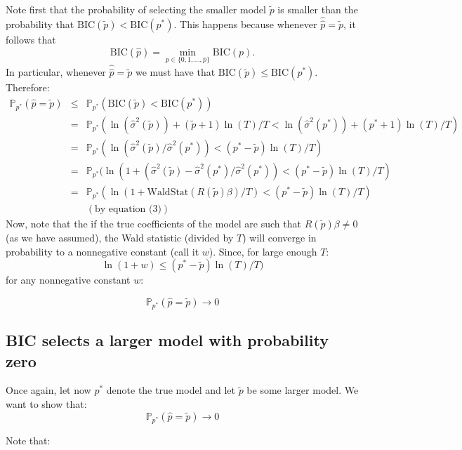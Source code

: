 \documentclass[12] {article}
\begin{document}
\noindent Note first that the probability of selecting the smaller model $\tilde{p}$ is smaller than the probability that $\textrm{BIC}(\tilde{p})<\textrm{BIC}(p^*)$. This happens because whenever $\widehat{\hat{p}} = \tilde{p}$, it follows that
\[ \textrm{BIC}(\widehat{p}) = \min_{p \in \{0,1, \ldots, \bar{p} \}} \textrm{BIC}(p).  \]
In particular, whenever $\widehat{\hat{p}} = \tilde{p}$ we must have that $\textrm{BIC}(\tilde{p})  \leq \textrm{BIC}(p^*)$. Therefore:
\begin{eqnarray*}
\mathbb{P}_{p^*}(\widehat{p} = \tilde{p}) &\leq& \mathbb{P}_{p^*}(\textrm{BIC}(\tilde{p})<\textrm{BIC}(p^*)) \\
&=& \mathbb{P}_{p^*}(\ln (\widehat{\sigma}^2(\tilde{p})) + (\tilde{p}+1)\ln(T)/T<\ln (\widehat{\sigma}^2(p^*)) + (p^*+1)\ln(T)/T)\\
&=&\mathbb{P}_{p^*}(\ln (\widehat{\sigma}^2(\tilde{p})/\widehat{\sigma}^2(p^*))  < (p^*-\tilde{p})\ln(T)/T) \\
&=& \mathbb{P}_{p^*}(\ln (1+ (\widehat{\sigma}^2(\tilde{p})-\widehat{\sigma}^2(p^*)/\widehat{\sigma}^2(p^*))  < (p^*-\tilde{p})\ln(T)/T) \\
&=& \mathbb{P}_{p^*}(\ln (1+ \textrm{WaldStat} (R(\tilde{p})\beta)/T)  < (p^*-\tilde{p})\ln(T)/T) \\
&&(\textrm{by equation (3)}) 
\end{eqnarray*}
Now, note that the if the true coefficients of the model are such that $R(\tilde{p}) \beta \neq 0$ (as we have assumed), the Wald statistic (divided by $T$) will converge in probability to a nonnegative constant (call it $w$). Since, for large enough $T$: 
\[ \ln (1+ w ) \leq (p^*-\tilde{p})\ln(T)/T) \]
\noindent for any nonnegative constant $w$:

\[ \mathbb{P}_{p^*}(\widehat{p} = \tilde{p})  \rightarrow 0 \]


\subsection{BIC selects a larger model with probability zero}
Once again, let now $p^*$ denote the true model and let $\tilde{p}$ be some larger model. We want to show that:
\begin{equation}
\mathbb{P}_{p^*} (\widehat{p}=\tilde{p}) \rightarrow 0
\end{equation}

Note that:
\end{document}
